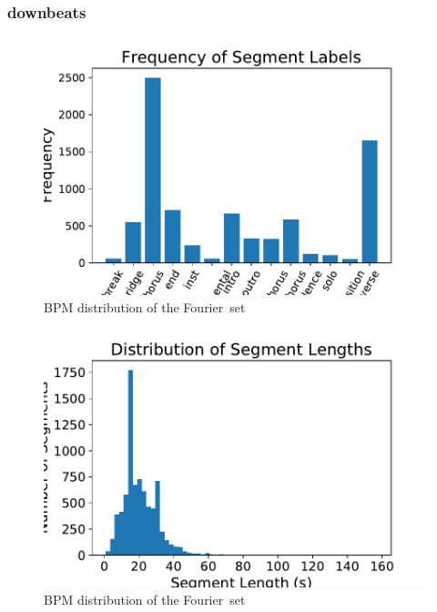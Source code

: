 \documentclass{article}
\newcommand{\setName}{Fourier}
\begin{document}
\subsubsection{downbeats}

\begin{figure}
    \centerline{\includegraphics[width=\columnwidth]{figs/SegmentLabels_distribution.pdf}}
    \caption{BPM distribution of the \setName~set}
    \label{fig:seglabel_dist}
\end{figure}

\begin{figure}
    \centerline{\includegraphics[width=\columnwidth]{figs/SegmentLength_distribution.pdf}}
    \caption{BPM distribution of the \setName~set}
    \label{fig:seglen_dist}
\end{figure}
\end{document}
